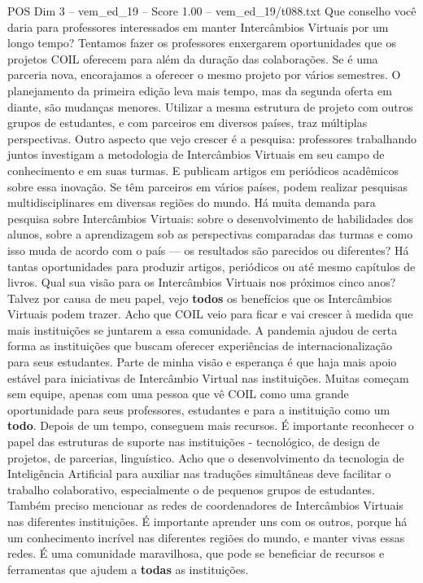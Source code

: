 \begin{textsample}{POS Dim 3 – vem\_ed\_19 – Score 1.00 – vem\_ed\_19/t088.txt}  \label{ex:f3_pos_022}
Que conselho você daria para professores interessados em manter Intercâmbios Virtuais por um longo tempo?
Tentamos fazer os professores enxergarem oportunidades que os projetos COIL oferecem para além da duração das colaborações.
Se é uma parceria nova, encorajamos a oferecer o mesmo projeto por vários semestres.
O planejamento da primeira edição leva mais tempo, mas da segunda oferta em diante, são mudanças menores.
Utilizar a mesma estrutura de projeto com outros grupos de estudantes, e com parceiros em diversos países, traz múltiplas perspectivas.
Outro aspecto que vejo crescer é a pesquisa: professores trabalhando juntos investigam a metodologia de Intercâmbios Virtuais em seu campo de conhecimento e em suas turmas.
E publicam artigos em periódicos acadêmicos sobre essa inovação.
Se têm parceiros em vários países, podem realizar pesquisas multidisciplinares em diversas regiões do mundo.
Há muita demanda para pesquisa sobre Intercâmbios Virtuais: sobre o desenvolvimento de habilidades dos alunos, sobre a aprendizagem sob as perspectivas comparadas das turmas e como isso muda de acordo com o país — os resultados são parecidos ou diferentes?
Há tantas oportunidades para produzir artigos, periódicos ou até mesmo capítulos de livros.
Qual sua visão para os Intercâmbios Virtuais nos próximos cinco anos?
Talvez por causa de meu papel, vejo \textbf{todos} os benefícios que os Intercâmbios Virtuais podem trazer.
Acho que COIL veio para ficar e vai crescer à medida que mais instituições se juntarem a essa comunidade.
A pandemia ajudou de certa forma as instituições que buscam oferecer experiências de internacionalização para seus estudantes.
Parte de minha visão e esperança é que haja mais apoio estável para iniciativas de Intercâmbio Virtual nas instituições.
Muitas começam sem equipe, apenas com uma pessoa que vê COIL como uma grande oportunidade para seus professores, estudantes e para a instituição como um \textbf{todo}.
Depois de um tempo, conseguem mais recursos.
É importante reconhecer o papel das estruturas de suporte nas instituições - tecnológico, de design de projetos, de parcerias, linguístico.
Acho que o desenvolvimento da tecnologia de Inteligência Artificial para auxiliar nas traduções simultâneas deve facilitar o trabalho colaborativo, especialmente o de pequenos grupos de estudantes.
Também preciso mencionar as redes de coordenadores de Intercâmbios Virtuais nas diferentes instituições.
É importante aprender uns com os outros, porque há um conhecimento incrível nas diferentes regiões do mundo, e manter vivas essas redes.
É uma comunidade maravilhosa, que pode se beneficiar de recursos e ferramentas que ajudem a \textbf{todas} as instituições.

\end{textsample}
